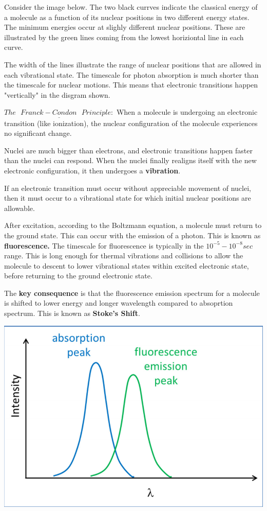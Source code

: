 \documentclass[12pt, letterpaper]{article}
\begin{document}
Consider the image below. The two black currves indicate the classical energy of a molecule as a function of its nuclear positions in two different
energy states. The minimum energies occur at slighly different nuclear positions. These are illustrated by the green lines coming from the lowest horiziontal line
in each curve. 

The width of the lines illustrate the range of nuclear positions that are allowed in each vibrational state. 
The timescale for photon absorption is much shorter than the timescale for nuclear motions. This means that electronic transitions happen 
"vertically" in the disgram shown. 

$\underline{The \text{ } Franck-Condon \text{ } Principle:}$ When a molecule is undergoing an electronic transition (like ionization), the nuclear configuration of the molecule experiences no significant change.

Nuclei are much bigger than electrons, and electronic transitions happen faster than the nuclei can respond. When the nuclei finally realigns itself
with the new electronic configuration, it then undergoes a \textbf{vibration}. 

If an electronic transition must occur without appreciable movement of nuclei, then it must occur to a vibrational state for which initial nuclear positions are allowable. 

After excitation, according to the Boltzmann equation, a molecule must return to the ground state. This can occur with the emission of a photon. This is known as 
\textbf{fluorescence.} The timescale for fluorescence is typically in the \( 10^{-5} - 10^{-8} sec \) range. 
This is long enough for thermal vibrations and collisions to allow the molecule to descent to lower vibrational states within excited electronic state, before returning 
to the ground electronic state. 

The \textbf{key consequence} is that the fluorescence emission spectrum for a molecule is shifted to lower energy and longer wavelength compared to absoprtion spectrum.
This is known as \textbf{Stoke's Shift}. 

\begin{center}
    \includegraphics[scale = 0.50]{stokes shift.png}
\end{center}
\end{document}

